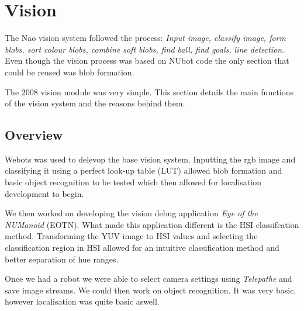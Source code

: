 \section{Vision}
The Nao vision system followed the process: \emph{Input image, classify image, form blobs, sort colour blobs, combine soft blobs, find ball, find goals, line detection}. Even though the vision process was based on NUbot code the only section that could be reused was blob formation. 

The 2008 vision module was very simple. This section details the main functions of the vision system and the reasons behind them. 
\subsection{Overview}

Webots was used to delevop the base vision system. Inputting the rgb image and classifying it using a perfect look-up table (LUT) allowed blob formation and basic object recognition to be tested which then allowed for localisation development to begin.

We then worked on developing the vision debug application \emph{Eye of the NUManoid} (EOTN). What made this application different is the HSI classifcation method. Transforming the YUV image to HSI values and selecting the classification region in HSI allowed for an intuitive classification method and better separation of hue ranges. 

Once we had a robot we were able to select camera settings using \emph{Telepathe} and save image streams. We could then work on object recognition. It was very basic, however localisation was quite basic aswell. 



